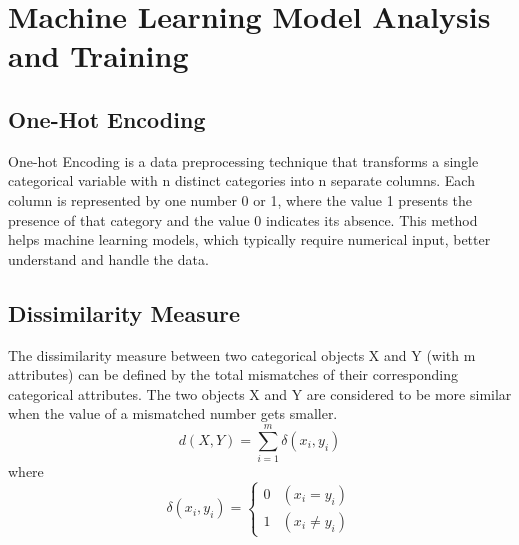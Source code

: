 \documentclass{article}
\makeatletter
\newcommand\subsubsubsection{\@startsection{paragraph}{4}{\z@}{-2.5ex\@plus -1ex \@minus -.25ex}{1.25ex \@plus .25ex}{\normalfont\normalsize\bfseries}}
\makeatother
\begin{document}


\section{Machine Learning Model Analysis and Training}
\subsection{One-Hot Encoding}
One-hot Encoding is a data preprocessing technique that transforms a single categorical variable with n distinct categories 
into n separate columns. Each column is represented by one number 0 or 1, where the value 1 presents the presence of that category 
and the value 0 indicates its absence.\citep{thuy2020optimize} This method helps machine learning models, which typically require numerical input, 
better understand and handle the data.

\subsection{Dissimilarity Measure}
The dissimilarity measure between two categorical objects X and Y (with m attributes) can be defined by the total mismatches of their corresponding categorical attributes. The two objects X and Y are considered to be more similar when the value of a mismatched number gets smaller.\citep{huang1998extensions}
        $$d(X,Y) = \sum_{i=1}^{m}\delta{(x_i,y_i)}$$ where $$\delta{(x_i,y_i)} = \left\{\begin{array}{ll} 0 & (x_i = y_i) \\
        1 & (x_i \neq y_i)\end{array}\right.$$
\end{document}
